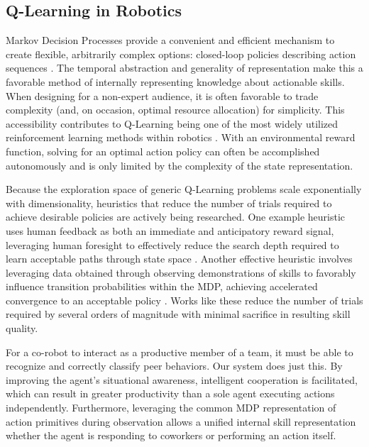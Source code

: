 \documentclass[letterpaper]{article}
\begin{document}
\subsection{Q-Learning in Robotics}
  Markov Decision Processes provide a convenient and efficient mechanism to create flexible, arbitrarily complex options: closed-loop policies describing action sequences \cite{SuttonMDP}. The temporal abstraction and generality of representation make this a favorable method of internally representing knowledge about actionable skills. When designing for a non-expert audience, it is often favorable to trade complexity (and, on occasion, optimal resource allocation) for simplicity. This accessibility contributes to Q-Learning being one of the most widely utilized reinforcement learning methods within robotics \cite{QLearningWatkins}. With an environmental reward function, solving for an optimal action policy can often be accomplished autonomously and is only limited by the complexity of the state representation.

  Because the exploration space of generic Q-Learning problems scale exponentially with dimensionality, heuristics that reduce the number of trials required to achieve desirable policies are actively being researched. One example heuristic uses human feedback as both an immediate and anticipatory reward signal, leveraging human foresight to effectively reduce the search depth required to learn acceptable paths through state space \cite{TAMER}. Another effective heuristic involves leveraging data obtained through observing demonstrations of skills to favorably influence transition probabilities within the MDP, achieving accelerated convergence to an acceptable policy \cite{LFDSurvey}. Works like these reduce the number of trials required by several orders of magnitude with minimal sacrifice in resulting skill quality.

  For a co-robot to interact as a productive member of a team, it must be able to recognize and correctly classify peer behaviors. Our system does just this.  By improving the agent's situational awareness, intelligent cooperation is facilitated, which can result in greater productivity than a sole agent executing actions independently.  Furthermore, leveraging the common MDP representation of action primitives during observation allows a unified internal skill representation whether the agent is responding to coworkers or performing an action itself.
\end{document}
